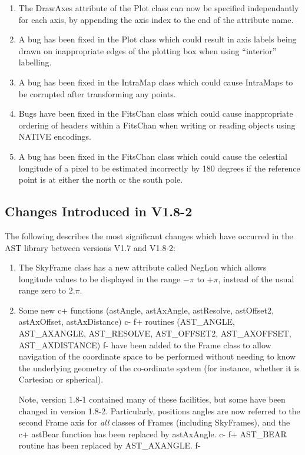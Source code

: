 \documentclass[twoside,11pt]{article}
\begin{document}
\begin{enumerate}
\item The DrawAxes attribute of the Plot class can now be specified
independantly for each axis, by appending the axis index to the
end of the attribute name.

\item A bug has been fixed in the Plot class which could result in axis
labels being drawn on inappropriate edges of the plotting box when using
``interior'' labelling.

\item A bug has been fixed in the IntraMap class which could cause IntraMaps
to be corrupted after transforming any points.

\item Bugs have been fixed in the FitsChan class which could cause
inappropriate ordering of headers within a FitsChan when writing or
reading objects using NATIVE encodings.  

\item A bug has been fixed in the FitsChan class which could cause the
celestial longitude of a pixel to be estimated incorrectly by 180 degrees
if the reference point is at either the north or the south pole. 

\end{enumerate}


\subsection{Changes Introduced in V1.8-2}

The following describes the most significant changes which have
occurred in the AST library between versions V1.7 and V1.8-2:

\begin{enumerate}

\item The SkyFrame class has a new attribute called NegLon which allows
   longitude values to be displayed in the range $-\pi$ to $+\pi$, instead 
   of the usual range zero to $2.\pi$.

\item Some new 
c+
functions (astAngle, astAxAngle, astResolve, astOffset2, astAxOffset, 
astAxDistance) 
c-
f+
routines (AST\_ANGLE, AST\_AXANGLE, AST\_RESOLVE, AST\_OFFSET2, AST\_AXOFFSET, 
AST\_AXDISTANCE) 
f-
have been added to the Frame class to allow navigation of the coordinate space 
to be performed without needing to know the underlying geometry
of the co-ordinate system (for instance, whether it is Cartesian or
spherical). 

Note, version 1.8-1 contained many of these facilities, but 
some have been changed in version 1.8-2. Particularly, positions angles
are now referred to the second Frame axis for {\em all} classes of Frames
(including SkyFrames), and the 
c+
astBear function has been replaced by astAxAngle.
c-
f+
AST\_BEAR routine has been replaced by AST\_AXANGLE.
f-

\end{enumerate}
\end{document}
